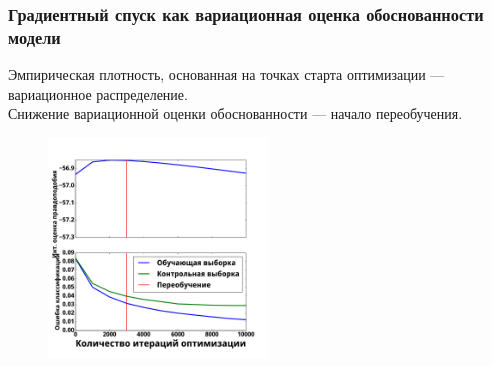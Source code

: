 \documentclass[usenames,dvipsnames,11pt,pdf,utf8,russian,aspectratio=43]{beamer}
\begin{document}
\begin{frame}

\frametitle{Градиентный спуск как вариационная оценка обоснованности модели}
\small
Эмпирическая плотность, основанная на точках старта оптимизации --- вариационное распределение.\\
Снижение вариационной оценки обоснованности ---  начало переобучения.


\begin{multicols}{2}

\begin{figure}
\vspace*{-0.2cm}
\end{figure}

\columnbreak


\begin{figure}
{\includegraphics[width=0.52\textwidth]{./slide_plots/sgd_show.pdf}}
\end{figure}
\end{multicols}
\end{frame}
\end{document}
